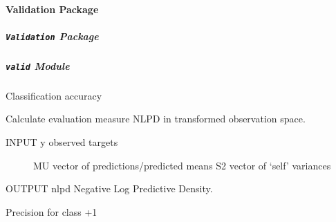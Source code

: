 \documentclass[letterpaper,10pt,english]{sphinxmanual}
\begin{document}
\paragraph{Validation Package}
\label{pyGPs.Validation:validation-package}\label{pyGPs.Validation::doc}

\subparagraph{\texttt{Validation} Package}
\label{pyGPs.Validation:id1}\label{pyGPs.Validation:module-pyGPs.Validation}

\subparagraph{\texttt{valid} Module}
\label{pyGPs.Validation:valid-module}\label{pyGPs.Validation:module-pyGPs.Validation.valid}

\begin{fulllineitems}
\label{pyGPs.Validation:pyGPs.Validation.valid.ACC}
Classification accuracy

\end{fulllineitems}


\begin{fulllineitems}
\label{pyGPs.Validation:pyGPs.Validation.valid.NLPD}
Calculate evaluation measure NLPD in transformed observation space.
\begin{description}
\item[{INPUT   y     observed targets}] \leavevmode
MU    vector of predictions/predicted means
S2    vector of `self' variances

\end{description}

OUTPUT  nlpd  Negative Log Predictive Density.

\end{fulllineitems}


\begin{fulllineitems}
\label{pyGPs.Validation:pyGPs.Validation.valid.Prec}
Precision for class +1

\end{fulllineitems}

\end{document}
